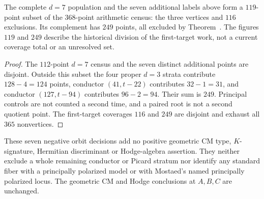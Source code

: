 \begin{corollary}\label{cor:geometry119}
The complete $d=7$ population and the seven additional labels above form
a $119$-point subset of the $368$-point arithmetic census: the three
vertices and $116$ exclusions. Its complement has $249$ points,
all excluded by Theorem~. The figures
$119$ and $249$ describe the historical division of the first-target
work, not a current coverage total or an unresolved set.
\end{corollary}
\begin{proof}
The $112$-point $d=7$ census and the seven distinct additional points
are disjoint. Outside this subset the four proper $d=3$ strata
contribute $128-4=124$ points, conductor $(41,t-22)$ contributes
$32-1=31$, and conductor $(127,t-94)$ contributes $96-2=94$.
Their sum is $249$. Principal controls are not counted a second time,
and a paired root is not a second quotient point. The first-target
coverages $116$ and $249$ are disjoint and exhaust all $365$ nonvertices.
\end{proof}

\begin{remark}
These seven negative orbit decisions add no positive geometric CM type,
$K$-signature, Hermitian discriminant or Hodge-algebra assertion. They
neither exclude a whole remaining conductor or Picard stratum nor
identify any standard fiber with a principally polarized model or with
Mostaed's named principally polarized locus. The geometric CM and Hodge
conclusions at $A,B,C$ are unchanged.
\end{remark}

